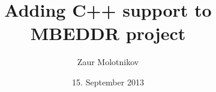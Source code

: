 \documentclass{article}
\title{Adding C++ support to MBEDDR project}
\author{Zaur Molotnikov}
\date{15. September 2013}
\begin{document}
 


\tumcoverpage
\tumtitlepage
\tumdeclrpage
\end{document}

